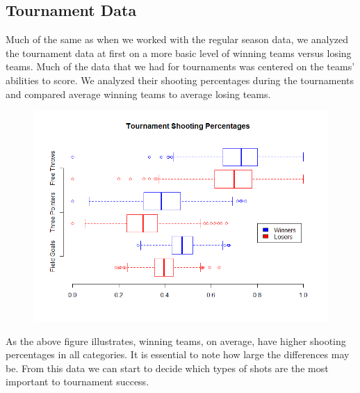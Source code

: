 \documentclass[]{scrartcl}
\begin{document}
\subsection*{Tournament Data}
Much of the same as when we worked with the regular season data, we analyzed the tournament data at first on a more basic level of winning teams versus losing teams. Much of the data that we had for tournaments was centered on the teams' abilities to score. We analyzed their shooting percentages during the tournaments and compared average winning teams to average losing teams.
\begin{figure}[H]
	\centering
	\includegraphics[scale=.5]{TourneyShotPercent.png}
\end{figure}
As the above figure illustrates, winning teams, on average, have higher shooting percentages in all categories. It is essential to note how large the differences may be. From this data we can start to decide which types of shots are the most important to tournament success.
\end{document}
